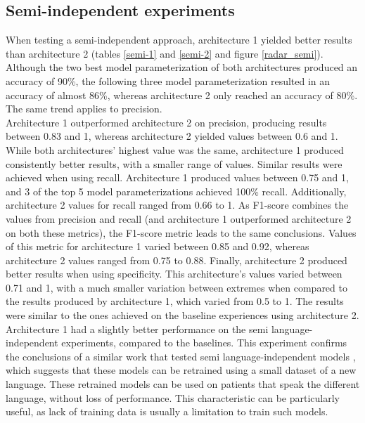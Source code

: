 \subsection{Semi-independent experiments}

When testing a semi-independent approach, architecture 1 yielded better results than architecture 2 (tables \ref{semi-1} and \ref{semi-2} and figure \ref{radar_semi}). Although the two best model parameterization of both architectures produced an accuracy of 90\%, the following three model parameterization resulted in an accuracy of almost 86\%, whereas architecture 2 only reached an accuracy of 80\%. The same trend applies to precision.
\\
Architecture 1 outperformed architecture 2 on precision, producing results between 0.83 and 1, whereas architecture 2 yielded values between 0.6 and 1. While both architectures' highest value was the same, architecture 1 produced consistently better results, with a smaller range of values. Similar results were achieved when using recall. Architecture 1 produced values between 0.75 and 1, and 3 of the top 5 model parameterizations achieved 100\% recall. Additionally, architecture 2 values for recall ranged from 0.66 to 1. As F1-score combines the values from precision and recall (and architecture 1 outperformed architecture 2 on both these metrics), the F1-score metric leads to the same conclusions. Values of this metric for architecture 1 varied between 0.85 and 0.92, whereas architecture 2 values ranged from 0.75 to 0.88. Finally, architecture 2 produced better results when using specificity. This architecture's values varied between 0.71 and 1, with a much smaller variation between extremes when compared to the results produced by architecture 1, which varied from 0.5 to 1. The results were similar to the ones achieved on the baseline experiences using architecture 2. Architecture 1 had a slightly better performance on the semi language-independent experiments, compared to the baselines. This experiment confirms the conclusions of a similar work that tested semi language-independent models \cite{parkinson_three_languages}, which suggests that these models can be retrained using a small dataset of a new language. These retrained models can be used on patients that speak the different language, without loss of performance. This characteristic can be particularly useful, as lack of training data is usually a limitation to train such models.

